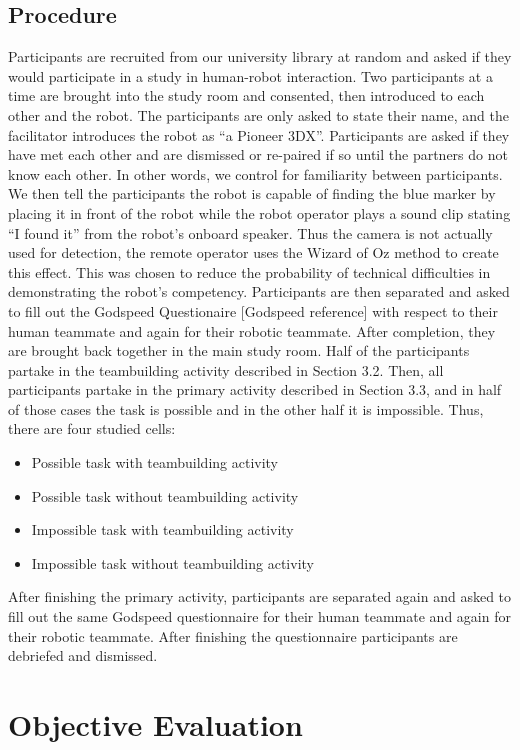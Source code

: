 \documentclass{acm_proc_article-sp}
\begin{document}
\subsection{Procedure}
Participants are recruited from our university library at random and asked if they would participate in a study in human-robot interaction. Two participants at a time are brought into the study room and consented, then introduced to each other and the robot. The participants are only asked to state their name, and the facilitator introduces the robot as ``a Pioneer 3DX''. Participants are asked if they have met each other and are dismissed or re-paired if so until the partners do not know each other. In other words, we control for familiarity between participants. We then tell the participants the robot is capable of finding the blue marker by placing it in front of the robot while the robot operator plays a sound clip stating ``I found it'' from the robot's onboard speaker. Thus the camera is not actually used for detection, the remote operator uses the Wizard of Oz method to create this effect. This was chosen to reduce the probability of technical difficulties in demonstrating the robot's competency.
Participants are then separated and asked to fill out the Godspeed Questionaire [Godspeed reference] with respect to their human teammate and again for their robotic teammate. After completion, they are brought back together in the main study room.
Half of the participants partake in the teambuilding activity described in Section 3.2. Then, all participants partake in the primary activity described in Section 3.3, and in half of those cases the task is possible and in the other half it is impossible. Thus, there are four studied cells:
\begin{itemize}
\item Possible task with teambuilding activity
\item Possible task without teambuilding activity
\item Impossible task with teambuilding activity
\item Impossible task without teambuilding activity
\end{itemize}
After finishing the primary activity, participants are separated again and asked to fill out the same Godspeed questionnaire for their human teammate and again for their robotic teammate. After finishing the questionnaire participants are debriefed and dismissed.

\section{Objective Evaluation}
\end{document}
